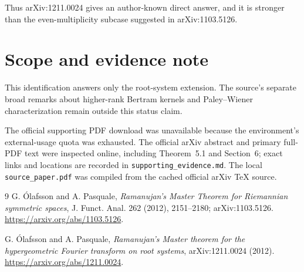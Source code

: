 \documentclass[11pt]{article}
\begin{document}
Thus arXiv:1211.0024 gives an author-known direct answer, and it is stronger
than the even-multiplicity subcase suggested in arXiv:1103.5126.

\newpage
\section*{Scope and evidence note}

This identification answers only the root-system extension.  The source's
separate broad remarks about higher-rank Bertram kernels and Paley--Wiener
characterization remain outside this status claim.

The official supporting PDF download was unavailable because the environment's
external-usage quota was exhausted.  The official arXiv abstract and primary
full-PDF text were inspected online, including Theorem~5.1 and Section~6; exact
links and locations are recorded in \texttt{supporting\_evidence.md}.  The
local \texttt{source\_paper.pdf} was compiled from the cached official arXiv
TeX source.

\begin{thebibliography}{9}
G. Ólafsson and A. Pasquale,
\emph{Ramanujan's Master Theorem for Riemannian symmetric spaces},
J. Funct. Anal. 262 (2012), 2151--2180; arXiv:1103.5126.
\url{https://arxiv.org/abs/1103.5126}.

G. Ólafsson and A. Pasquale,
\emph{Ramanujan's Master theorem for the hypergeometric Fourier transform on
root systems}, arXiv:1211.0024 (2012).
\url{https://arxiv.org/abs/1211.0024}.
\end{thebibliography}
\end{document}
